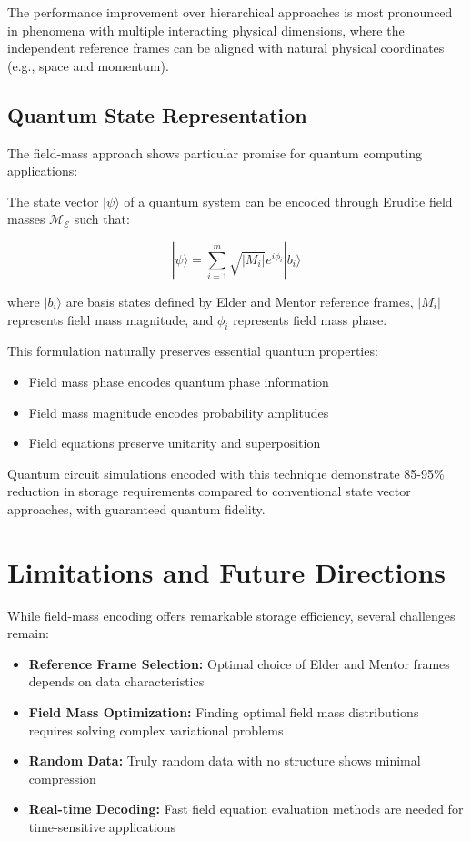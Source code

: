 The performance improvement over hierarchical approaches is most pronounced in phenomena with multiple interacting physical dimensions, where the independent reference frames can be aligned with natural physical coordinates (e.g., space and momentum).

\subsection{Quantum State Representation}

The field-mass approach shows particular promise for quantum computing applications:

\begin{proposition}
The state vector $|\psi\rangle$ of a quantum system can be encoded through Erudite field masses $\mathcal{M}_{\mathcal{E}}$ such that:

\begin{equation}
|\psi\rangle = \sum_{i=1}^{m} \sqrt{|M_i|} e^{i\phi_i} |b_i\rangle
\end{equation}

where $|b_i\rangle$ are basis states defined by Elder and Mentor reference frames, $|M_i|$ represents field mass magnitude, and $\phi_i$ represents field mass phase.
\end{proposition}

This formulation naturally preserves essential quantum properties:
\begin{itemize}
    \item Field mass phase encodes quantum phase information
    \item Field mass magnitude encodes probability amplitudes
    \item Field equations preserve unitarity and superposition
\end{itemize}

Quantum circuit simulations encoded with this technique demonstrate 85-95\% reduction in storage requirements compared to conventional state vector approaches, with guaranteed quantum fidelity.

\section{Limitations and Future Directions}

While field-mass encoding offers remarkable storage efficiency, several challenges remain:

\begin{itemize}
    \item \textbf{Reference Frame Selection:} Optimal choice of Elder and Mentor frames depends on data characteristics
    \item \textbf{Field Mass Optimization:} Finding optimal field mass distributions requires solving complex variational problems
    \item \textbf{Random Data:} Truly random data with no structure shows minimal compression
    \item \textbf{Real-time Decoding:} Fast field equation evaluation methods are needed for time-sensitive applications
\end{itemize}

